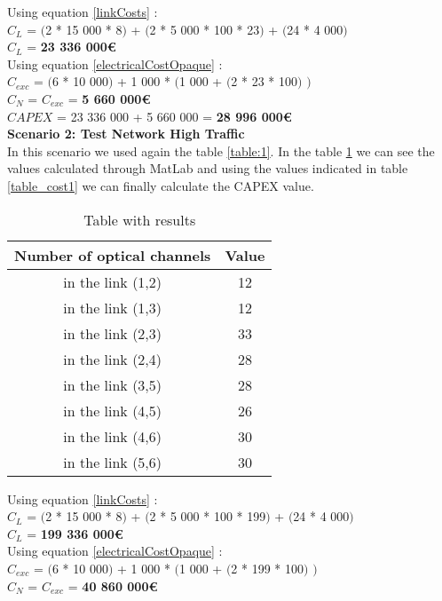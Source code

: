 Using equation \ref{linkCosts} : \\
$C_L$ = $($2 * 15 000 * 8$)$ + $($2 * 5 000 * 100 * 23$)$ + $($24 * 4 000$)$ \\
$C_L$ = \textbf{23 336 000\euro} \\
\newpage
Using equation \ref{electricalCostOpaque} : \\
$C_{exc}$ = $($6 * 10 000$)$ + 1 000 * $($1 000 + $($2 * 23 * 100$)$ $)$ \\
$C_N$ = $C_{exc}$ = \textbf{5 660 000\euro} \\

$CAPEX$ = 23 336 000 + 5 660 000 = \textbf{28 996 000\euro}\\


\vspace{11pt}
\textbf{Scenario 2: Test Network High Traffic} \label{Scenario2_opaque} \\
In this scenario we used again the table \ref{table:1}. In the table \ref{result_ILP2} we can see the values calculated through MatLab and using the values indicated in table \ref{table_cost1} we can finally calculate the CAPEX value. \\

\begin{table}[h!]
\centering
\begin{tabular}{|| c | c||}
 \hline
 Number of optical channels & Value \\
 \hline\hline
 in the link (1,2) & 12 \\
 in the link (1,3) & 12 \\
 in the link (2,3) & 33 \\
 in the link (2,4) & 28 \\
 in the link (3,5) & 28 \\
 in the link (4,5) & 26 \\
 in the link (4,6) & 30 \\
 in the link (5,6) & 30 \\
 \hline
\end{tabular}
\caption{Table with results}
\label{result_ILP2}
\end{table}


Using equation \ref{linkCosts} : \\
$C_L$ = $($2 * 15 000 * 8$)$ + $($2 * 5 000 * 100 * 199$)$ + $($24 * 4 000$)$ \\
$C_L$ = \textbf{199 336 000\euro} \\

Using equation \ref{electricalCostOpaque} : \\
$C_{exc}$ = $($6 * 10 000$)$ + 1 000 * $($1 000 + $($2 * 199 * 100$)$ $)$ \\
$C_N$ = $C_{exc}$ = \textbf{40 860 000\euro} \\

